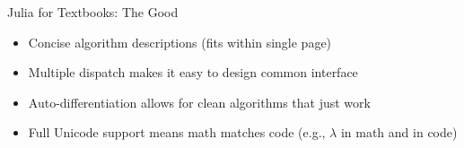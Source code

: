 \begin{frame}[fragile]{Julia for Textbooks: \textcolor{paloalto}{The Good}} \pause

\begin{itemize}
  \item \textcolor{paloalto}{Concise} algorithm descriptions (fits within single page) \pause
  \item \textcolor{paloalto}{Multiple dispatch} makes it easy to design common interface \pause
  \item \textcolor{paloalto}{Auto-differentiation} allows for clean algorithms that just work \pause
  \item \textcolor{paloalto}{Full Unicode support} means math matches code (e.g., $\lambda$ in math and  in code)
\end{itemize}

\pause

\phantom{---}

\small
{}

\end{frame}